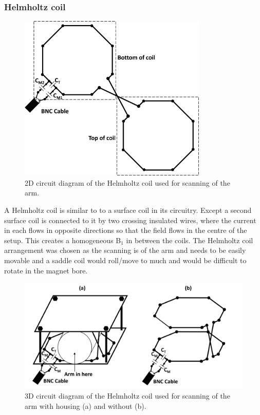 \documentclass[class=article, crop=false]{standalone}
\begin{document}
\subsubsection{Helmholtz coil}

\begin{figure}
    \centering
    \includegraphics[width=0.8\textwidth]{Figures/Theory/Planar_Helmholtz.png}
    \caption{2D circuit diagram of the Helmholtz coil used for scanning of the arm.}
    \label{fig:theory:2D_Helmholtz}
\end{figure}

A Helmholtz coil is similar to to a surface coil in its circuitry. Except a second surface coil is connected to it by two crossing insulated wires, where the current in each flows in opposite directions so that the field flows in the centre of the setup. This creates a homogeneous B$_1$ in between the coils. The Helmholtz coil arrangement was chosen as the scanning is of the arm and needs to be easily movable and a saddle coil would roll/move to much and would be difficult to rotate in the magnet bore.

\begin{figure}
    \centering
    \includegraphics[width=1\textwidth]{Figures/Theory/3D_Helmholtz.png}
    \caption{3D circuit diagram of the Helmholtz coil used for scanning of the arm with housing (a) and without (b).}
    \label{fig:theory:3D_Helmholtz}
\end{figure}
\end{document}
